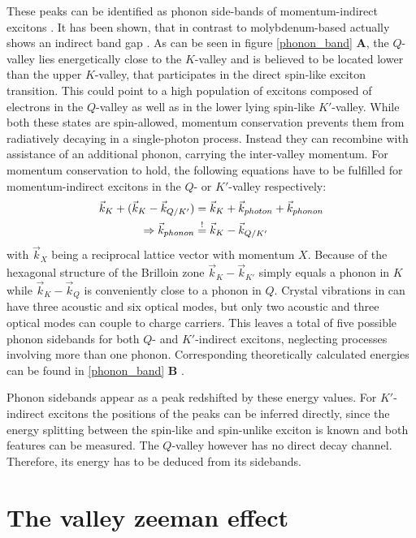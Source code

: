 These peaks can be identified as phonon side-bands of momentum-indirect excitons \cite{lindlau_identifying_2017}. It has been shown, that in contrast to molybdenum-based \tmds \wse actually shows an indirect band gap \cite{zhang_probing_2015, hsu_evidence_2017}. As can be seen in figure \ref{phonon_band} \textbf{A}, the $Q$-valley lies energetically close to the $K$-valley and is believed to be located lower than the upper $K$-valley, that participates in the direct spin-like exciton transition. This could point to a high population of excitons composed of electrons in the $Q$-valley as well as in the lower lying spin-like $K'$-valley. While both these states are spin-allowed, momentum conservation prevents them from radiatively decaying in a single-photon process. Instead they can recombine with assistance of an additional phonon, carrying the inter-valley momentum. For momentum conservation to hold, the following equations have to be fulfilled for momentum-indirect excitons in the $Q$- or $K'$-valley respectively:
\begin{align}
	\vec{k}_K + (\vec{k}_K - \vec{k}_{Q/K'}) &= \vec{k}_K + \vec{k}_{photon} + \vec{k}_{phonon}\\
	\Rightarrow \vec{k}_{phonon} &\overset{!}{=} \vec{k}_K - \vec{k}_{Q/K'}
\end{align}
with $\vec{k}_X$ being a reciprocal lattice vector with momentum $X$. Because of the hexagonal structure of the Brilloin zone $\vec{k}_K - \vec{k}_{K'}$ simply equals a phonon in $K$ while $\vec{k}_K - \vec{k}_{Q}$ is conveniently close to a phonon in $Q$. Crystal vibrations in \tmds can have three acoustic and six optical modes, but only two acoustic and three optical modes can couple to charge carriers. This leaves a total of five possible phonon sidebands for both $Q$- and $K'$-indirect excitons, neglecting processes involving more than one phonon. Corresponding theoretically calculated energies can be found in \ref{phonon_band} \textbf{B} \cite{jin_intrinsic_2014}. 

Phonon sidebands appear as a peak redshifted by these energy values. For $K'$-indirect excitons the positions of the peaks can be inferred directly, since the energy splitting between the spin-like and spin-unlike exciton is known and both features can be measured. The $Q$-valley however has no direct decay channel. Therefore, its energy has to be deduced from its sidebands.



\section{The valley zeeman effect}\label{zeeman}

